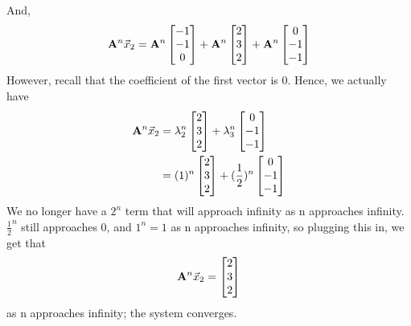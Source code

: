 \begin{enumerate}
{    And, 
    \begin{align*}
    \mathbf{A}^n\vec{x}_2 &= \mathbf{A}^n \begin{bmatrix}-1 \\ -1 \\ 0\end{bmatrix} + \mathbf{A}^n \begin{bmatrix}2 \\ 3 \\ 2\end{bmatrix} + \mathbf{A}^n \begin{bmatrix}0 \\ -1 \\ -1\end{bmatrix} \\
    \end{align*}
    However, recall that the coefficient of the first vector is 0. Hence, we actually have
    \begin{align*}
    \mathbf{A}^n\vec{x}_2 &= \lambda_2^n \begin{bmatrix}2 \\ 3 \\ 2\end{bmatrix} + \lambda_3^n \begin{bmatrix}0 \\ -1 \\ -1\end{bmatrix} \\
    &= (1)^n \begin{bmatrix}2 \\ 3 \\ 2\end{bmatrix} + (\frac{1}{2})^n \begin{bmatrix}0 \\ -1 \\ -1\end{bmatrix} \\
   \end{align*}
  We no longer have a $2^n$ term that will approach infinity as n approaches infinity. $\frac{1}{2}^n$ still approaches 0, and $1^n = 1$ as n approaches infinity, so plugging this in, we get that $$\mathbf{A}^n\vec{x}_2 = \begin{bmatrix}2 \\ 3 \\ 2\end{bmatrix}$$ as n approaches infinity; the system converges.
    }
    

\end{enumerate}
